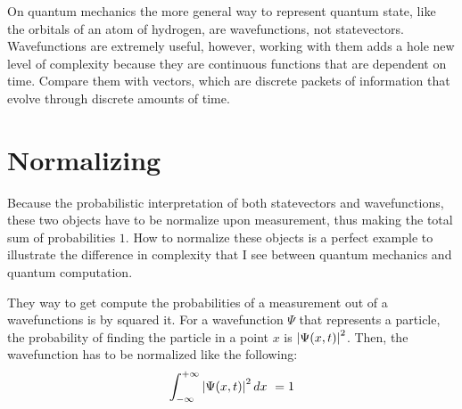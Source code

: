On quantum mechanics the more general way to represent quantum state, like the orbitals of an atom of hydrogen, are wavefunctions, not statevectors. Wavefunctions are extremely useful, however, working with them adds a hole new level of complexity because they are continuous functions that are dependent on time. Compare them with vectors, which are discrete packets of information that evolve through discrete amounts of time.

\section{Normalizing}
Because the probabilistic interpretation of both statevectors and wavefunctions, these two objects have to be normalize upon measurement, thus making the total sum of probabilities $1$. How to normalize these objects is a perfect example to illustrate the difference in complexity that I see between quantum mechanics and quantum computation. 

They way to get compute the probabilities of a measurement out of a wavefunctions is by squared it. For a wavefunction $\Psi$ that represents a particle, the probability of finding the particle in a point $x$ is $\abs{\Psi(x,t)}^2$. Then, the wavefunction has to be normalized like the following:
$$
\int_{-\infty}^{+\infty}\abs{\Psi(x,t)}^2\, dx\ = 1
$$

